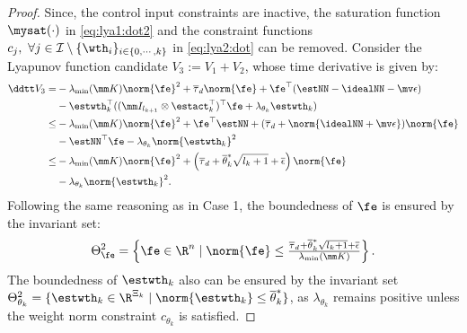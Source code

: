 \documentclass[journal]{IEEEtran}
\begin{document}
\begin{proof}
Since, the control input constraints are inactive, the saturation function $\mysat(\cdot)$ in \eqref{eq:lya1:dot2} and the constraint functions $c_j,\ \forall j\in\mathcal I \setminus \{\wth_i\}_{i\in\{0,\cdots,k\}}$ in \eqref{eq:lya2:dot} can be removed.
Consider the Lyapunov function candidate $V_3:=V_1+V_2$, whose time derivative is given by:
\begin{equation}
    \begin{aligned}
        \ddtt V_3
        =&
        -\lambda_{\min}(\mm K)\norm{\fe}^2
        +\overline\tau_d\norm{\fe}
        +\fe^\top (\estNN - \idealNN - \mv\epsilon)
        \\
        &
        -\estwth_k^\top (
            (\mm I_{l_{k+1}}\otimes \estact_k^\top)^\top
            \fe
            +
            \lambda_{\theta_k}\estwth_k
        )
        \\
        \le&
        -\lambda_{\min}(\mm K)\norm{\fe}^2
        +\fe^\top \estNN
        +(
            \overline\tau_d+\norm{
                \idealNN+\mv\epsilon
            }
        )
        \norm{\fe}
        \\
        &
        -\estNN^\top\fe 
        -\lambda_{\theta_k}\norm{\estwth_k}^2
        \\
        \le&
        -
        \lambda_{\min}(\mm K)
        \norm{\fe}^2
        +
        \left(
            \overline\tau_d
            +
            \overline{\theta}^*_k\sqrt{l_{k}+1}
            +
            \overline{\epsilon}
        \right)
        \norm{\fe}
        \\
        &
        -
        \lambda_{\theta_k}\norm{\estwth_k}^2
        .
    \end{aligned}
    \label{eq:lya3:dot}
\end{equation}
Following the same reasoning as in Case 1, the boundedness of $\fe$ is ensured by the invariant set:
\begin{equation}
    \Theta_{\fe}^{2}
    =
    \left\{ 
        \fe \in \R^n 
        \mid 
        \norm{\fe} 
        \le 
        \tfrac{
            \overline\tau_d
            +
            \overline{\theta}^*_k\sqrt{l_{k}+1}
            +
            \overline{\epsilon}
        }{
            \lambda_{\min}(\mm K)
        }
    \right\}
    .
\end{equation}
The boundedness of $\estwth_k$ also can be ensured by the invariant set $\Theta_{\theta_k}^{2}=\{ \estwth_k \in \R^{\Xi_{k}} \mid \norm{\estwth_k} \le \overline\theta^*_k \}$, as $\lambda_{\theta_k}$ remains positive unless the weight norm constraint $c_{\theta_k}$ is satisfied.


\end{proof}
\end{document}

